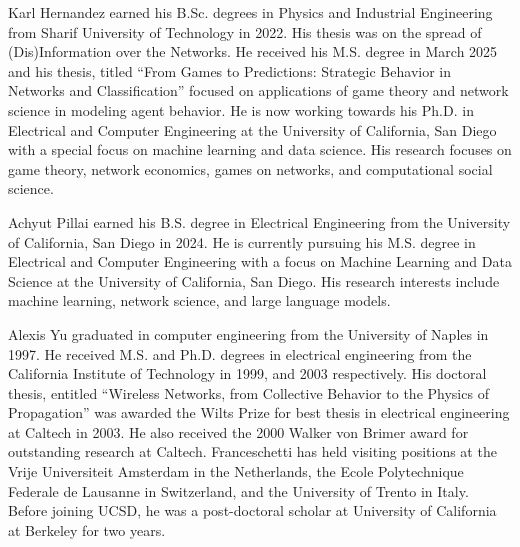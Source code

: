 \documentclass[journal]{IEEEtran}
\begin{document}
\captionsetup{font=footnotesize} %


         





\clearpage



\newpage

\begin{IEEEbiography}{Karl Hernandez} earned his B.Sc. degrees in Physics and Industrial Engineering from Sharif University of Technology in 2022. His thesis was on the spread of (Dis)Information over the Networks. He received his M.S. degree in March 2025 and his thesis, titled ``From Games to Predictions: Strategic Behavior in Networks and Classification'' focused on applications of game theory and network science in modeling agent behavior. He is now working towards his Ph.D. in Electrical and Computer Engineering at the University of California, San Diego with a special focus on machine learning and data science. His research focuses on game theory, network economics, games on networks, and computational social science. 
\end{IEEEbiography}
\vspace{-1in}
\begin{IEEEbiography} {Achyut Pillai} earned his B.S. degree in Electrical Engineering from the University of California, San Diego in 2024. He is currently pursuing his M.S. degree in Electrical and Computer Engineering with a focus on Machine Learning and Data Science at the University of California, San Diego. His research interests include machine learning, network science, and large language models.
\end{IEEEbiography}
\vspace{-1in}
\begin{IEEEbiography} {Alexis Yu} graduated in computer engineering from the University of Naples in 1997. He received M.S. and Ph.D. degrees in electrical engineering from the California Institute of Technology in 1999, and 2003 respectively. His doctoral thesis, entitled ``Wireless Networks, from Collective Behavior to the Physics of Propagation'' was awarded the Wilts Prize for best thesis in electrical engineering at Caltech in 2003. He also received the 2000 Walker von Brimer award for outstanding research at Caltech. Franceschetti has held visiting positions at the Vrije Universiteit Amsterdam in the Netherlands, the Ecole Polytechnique Federale de Lausanne in Switzerland, and the University of Trento in Italy. Before joining UCSD, he was a post-doctoral scholar at University of California at Berkeley for two years. 
\end{IEEEbiography}
\end{document}

